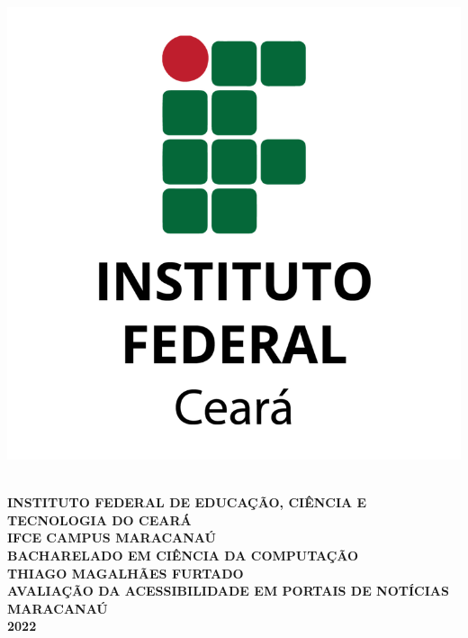 \documentclass[a4paper]{article}
\begin{document}
\thispagestyle{empty}

\begin{titlepage}
	\vfill
	\begin{center}
		\onehalfspacing
		\parbox{6cm}{\includegraphics[scale=0.2]{logo.png}}\\
		\begingroup
		\fontsize{12pt}{0pt}\selectfont
		{\large \textbf{INSTITUTO FEDERAL DE EDUCAÇÃO, CIÊNCIA E TECNOLOGIA DO CEARÁ}}\\[0.2cm]
		\fontsize{12pt}{0pt}\selectfont
		{\large \textbf{IFCE CAMPUS MARACANAÚ}}\\[0.2cm]
		\fontsize{12pt}{0pt}\selectfont	
		{\large \textbf{BACHARELADO EM CIÊNCIA DA COMPUTAÇÃO}}\\[3.5cm]
		\fontsize{12pt}{0pt}\selectfont
		{\large \textbf{THIAGO MAGALHÃES FURTADO}}\\[3.5cm]
		\fontsize{12pt}{0pt}\selectfont
		{\large \textbf{AVALIAÇÃO DA ACESSIBILIDADE EM PORTAIS DE NOTÍCIAS}}\\[3.5cm]
		\fontsize{12pt}{0pt}\selectfont
		{\large \textbf{MARACANAÚ}}\\[0.2cm]
		\fontsize{12pt}{0pt}\selectfont
		{\large \textbf{2022}}
		\endgroup
	\end{center}
\end{titlepage}
\end{document}
